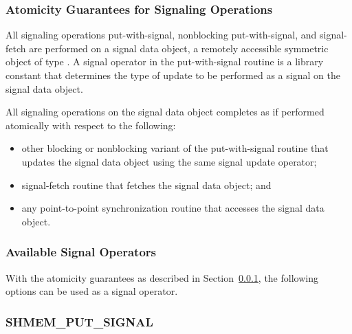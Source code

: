 \documentclass[10pt,oneside]{book}
\begin{document}
\subsubsection{Atomicity Guarantees for Signaling Operations}
\label{subsec:signal_atomicity}
All signaling operations put-with-signal, nonblocking put-with-signal, and
signal-fetch are performed on a signal data object, a remotely accessible
symmetric object of type . A signal operator in the
put-with-signal routine is a \openshmem library constant that determines the
type of update to be performed as a signal on the signal data object.

All signaling operations on the signal data object completes as if performed
atomically with respect to the following:
\begin{itemize}
    \item other blocking or nonblocking variant of the put-with-signal routine
    that updates the signal data object using the same signal update operator;
    \item signal-fetch routine that fetches the signal data object; and
    \item any point-to-point synchronization routine that accesses the signal
    data object.
\end{itemize}

\subsubsection{Available Signal Operators}
\label{subsec:signal_operator}

With the atomicity guarantees as described in
Section~\ref{subsec:signal_atomicity}, the following options can be used as a
signal operator.




\subsubsection{\textbf{SHMEM\_PUT\_SIGNAL}}\label{subsec:shmem_put_signal}

\end{document}
